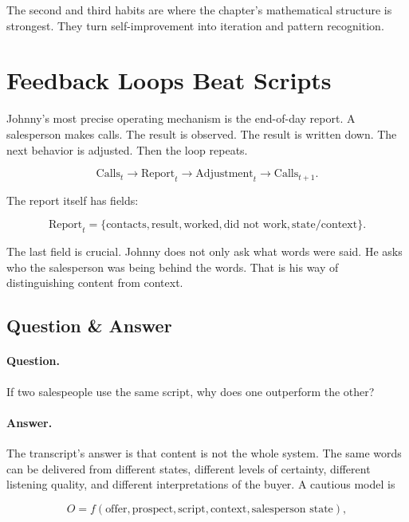 The second and third habits are where the chapter's mathematical structure is strongest. They turn self-improvement into iteration and pattern recognition.

\section{Feedback Loops Beat Scripts}

Johnny's most precise operating mechanism is the end-of-day report. A salesperson makes calls. The result is observed. The result is written down. The next behavior is adjusted. Then the loop repeats.

\begin{equation}
\text{Calls}_t
\longrightarrow
\text{Report}_t
\longrightarrow
\text{Adjustment}_t
\longrightarrow
\text{Calls}_{t+1}.
\end{equation}

The report itself has fields:

\begin{equation}
\text{Report}_t =
\{
\text{contacts},
\text{result},
\text{worked},
\text{did not work},
\text{state/context}
\}.
\end{equation}

The last field is crucial. Johnny does not only ask what words were said. He asks who the salesperson was being behind the words. That is his way of distinguishing content from context.

\subsection{Question \& Answer}

\paragraph{Question.}
If two salespeople use the same script, why does one outperform the other?

\paragraph{Answer.}
The transcript's answer is that content is not the whole system. The same words can be delivered from different states, different levels of certainty, different listening quality, and different interpretations of the buyer. A cautious model is

\begin{equation}
O =
f(
\text{offer},
\text{prospect},
\text{script},
\text{context},
\text{salesperson state}
),
\end{equation}

